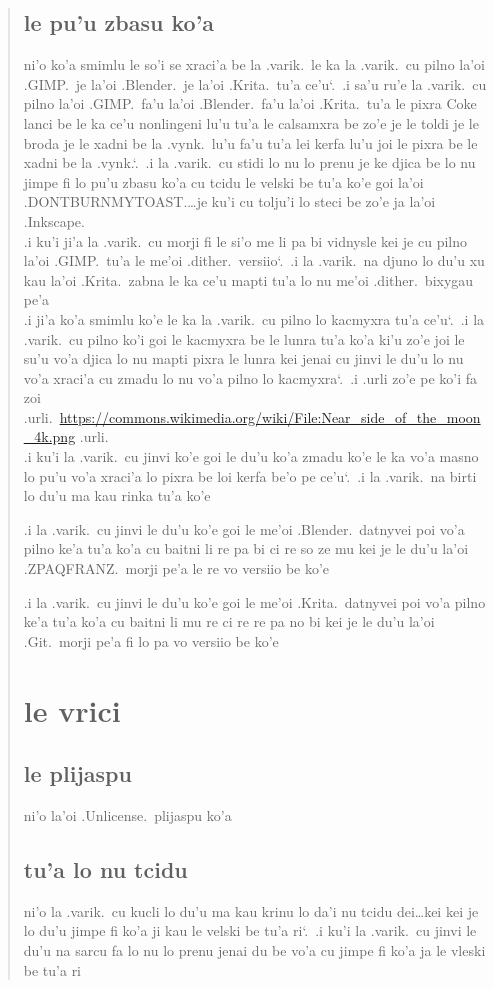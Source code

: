 \documentclass{report}
\newcommand\sds{\spacefactor\sfcode`.\ \space}
\begin{document}
\begin{quote}
	\subsection{le pu'u zbasu ko'a}
	ni'o ko'a smimlu le so'i se xraci'a be la .varik.\ le ka la .varik.\ cu pilno la'oi .GIMP.\ je la'oi .Blender.\ je la'oi .Krita.\ tu'a ce'u\sds  .i sa'u ru'e la .varik.\ cu pilno la'oi .GIMP.\ fa'u la'oi .Blender.\ fa'u la'oi .Krita.\ tu'a le pixra Coke lanci be le ka ce'u nonlingeni lu'u tu'a le calsamxra be zo'e je le toldi je le broda je le xadni be la .vynk.\ lu'u fa'u tu'a lei kerfa lu'u joi le pixra be le xadni be la .vynk.\sds  .i la .varik.\ cu stidi lo nu lo prenu je ke djica be lo nu jimpe fi lo pu'u zbasu ko'a cu tcidu le velski be tu'a ko'e goi la'oi .DONTBURNMYTOAST.\ldots je ku'i cu tolju'i lo steci be zo'e ja la'oi .Inkscape.\\
	.i ku'i ji'a la .varik.\ cu morji fi le si'o me li pa bi vidnysle kei je cu pilno la'oi .GIMP.\ tu'a le me'oi .dither.\ versiio\sds  .i la .varik.\ na djuno lo du'u xu kau la'oi .Krita.\ zabna le ka ce'u mapti tu'a lo nu me'oi .dither.\ bixygau pe'a\\
	.i ji'a ko'a smimlu ko'e le ka la .varik.\ cu pilno lo kacmyxra tu'a ce'u\sds  .i la .varik.\ cu pilno ko'i goi le kacmyxra be le lunra tu'a ko'a ki'u zo'e joi le su'u vo'a djica lo nu mapti pixra le lunra kei jenai cu jinvi le du'u lo nu vo'a xraci'a cu zmadu lo nu vo'a pilno lo kacmyxra\sds  .i .urli zo'e pe ko'i fa zoi .urli.\ \url{https://commons.wikimedia.org/wiki/File:Near_side_of_the_moon_4k.png} .urli.\\
	.i ku'i la .varik.\ cu jinvi ko'e goi le du'u ko'a zmadu ko'e le ka vo'a masno lo pu'u vo'a xraci'a lo pixra be loi kerfa be'o pe ce'u\sds  .i la .varik.\ na birti lo du'u ma kau rinka tu'a ko'e

	.i la .varik.\ cu jinvi le du'u ko'e goi le me'oi .Blender.\ datnyvei poi vo'a pilno ke'a tu'a ko'a cu baitni li re pa bi ci re so ze mu kei je le du'u la'oi .ZPAQFRANZ.\ morji pe'a le re vo versiio be ko'e

	.i la .varik.\ cu jinvi le du'u ko'e goi le me'oi .Krita.\ datnyvei poi vo'a pilno ke'a tu'a ko'a cu baitni li mu re ci re re pa no bi kei je le du'u la'oi .Git.\ morji pe'a fi lo pa vo versiio be ko'e

	\section{le vrici}
	\subsection{le plijaspu}
	ni'o la'oi .Unlicense.\ plijaspu ko'a

	\subsection{tu'a lo nu tcidu}
	ni'o la .varik.\ cu kucli lo du'u ma kau krinu lo da'i nu tcidu dei\ldots kei kei je lo du'u jimpe fi ko'a ji kau le velski be tu'a ri\sds  .i ku'i la .varik.\ cu jinvi le du'u na sarcu fa lo nu lo prenu jenai du be vo'a cu jimpe fi ko'a ja le vleski be tu'a ri
\end{quote}
\end{document}
